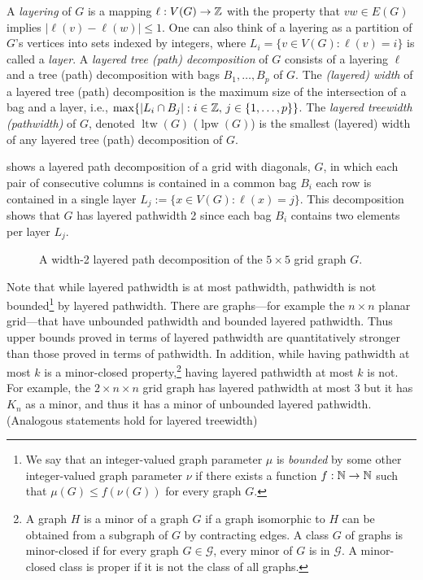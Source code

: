 \documentclass{patmorin}
\DeclareMathOperator{\lpw}{lpw}
\DeclareMathOperator{\ltw}{ltw}
\begin{document}
   A \emph{layering} of $G$ is a mapping $\ell:V(G)\to\mathbb{Z}$ with the
property that $vw\in E(G)$ implies $|\ell(v)-\ell(w)|\le 1$. One
can also think of a layering as a partition of $G$'s vertices into
sets indexed by integers, where $L_i=\{v\in V(G)
: \ell(v)=i\}$ is called a  \emph{layer}.  A \emph{layered tree (path) decomposition} of $G$ consists
of a layering $\ell$ and a tree (path) decomposition with bags $B_1,\ldots,B_p$ of $G$.
The \emph{(layered) width} of a layered tree (path) decomposition is the maximum
size of the intersection of a bag and a layer, i.e., $\max\{|L_i\cap
B_j|:i\in\mathbb{Z},\, j\in\{1,\ldots,p\}\}$.  The \emph{layered treewidth (pathwidth)} of
$G$, denoted $\ltw(G)$ ($\lpw(G)$) is the smallest (layered) width of any layered
tree (path) decomposition of $G$.

 shows a layered path decomposition of a grid with diagonals, $G$, in which each pair of consecutive columns is contained in a common bag $B_i$ each row is contained in a single layer $L_j:=\{x\in V(G):\ell(x)=j\}$.  This decomposition shows that $G$ has layered pathwidth 2 since each bag $B_i$ contains two elements per layer $L_j$.
\begin{figure}
    \caption{A width-2 layered path decomposition of the $5\times 5$ grid graph $G$.}
\end{figure}


Note that while layered pathwidth is at most pathwidth, pathwidth is
not bounded\footnote{We say that an integer-valued graph parameter $\mu$ is \emph{bounded} by some other integer-valued graph parameter $\nu$ if there exists a function $f:\mathbb{N}\to\mathbb{N}$ such that $\mu(G)\le f(\nu(G))$ for every graph $G$.} by layered pathwidth. There are graphs---for example the $n \times
n$ planar grid---that have unbounded pathwidth and bounded layered
pathwidth. Thus upper bounds proved in terms of layered pathwidth are
quantitatively stronger than those proved in terms of pathwidth. In addition, while having pathwidth at most $k$ is a minor-closed property,\footnote{A graph $H$ is a minor of a graph $G$ if a graph isomorphic to $H$ can be obtained from a
subgraph of $G$ by contracting edges. A class $G$ of graphs is minor-closed if for every graph $G\in\mathcal{G}$, every minor of $G$
is in $\mathcal{G}$. A minor-closed class is proper if it is not the class of all graphs.} having layered pathwidth at most $k$ is not.  For
example, the $2 \times n \times n$ grid graph has layered pathwidth at most $3$ but
it has  $K_n$ as a minor, and thus it has a minor of unbounded layered pathwidth. (Analogous statements hold for layered treewidth)
\end{document}
